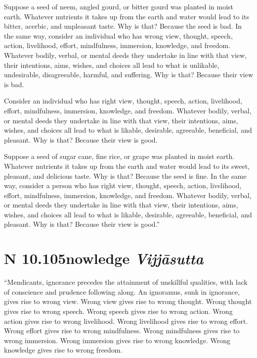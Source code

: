 \documentclass[12pt,openany]{book}%
\newcommand*{\suttatitleacronym}[1]{\smaller[2]{#1}\vspace*{.3em}}
\newcommand*{\suttatitletranslation}[1]{\linebreak{#1}}
\newcommand*{\suttatitleroot}[1]{\linebreak\smaller[2]\itshape{#1}}
\newcommand*{\tocacronym}[1]{\hspace*{-3.3em}{#1}\quad}
\newcommand*{\toctranslation}[1]{#1}
\newcommand*{\tocroot}[1]{(\textit{#1})}
\begin{document}
Suppose a seed of neem, angled gourd, or bitter gourd was planted in moist earth. Whatever nutrients it takes up from the earth and water would lead to its bitter, acerbic, and unpleasant taste. Why is that? Because the seed is bad. In the same way, consider an individual who has wrong view, thought, speech, action, livelihood, effort, mindfulness, immersion, knowledge, and freedom. Whatever bodily, verbal, or mental deeds they undertake in line with that view, their intentions, aims, wishes, and choices all lead to what is unlikable, undesirable, disagreeable, harmful, and suffering. Why is that? Because their view is bad. 

Consider an individual who has right view, thought, speech, action, livelihood, effort, mindfulness, immersion, knowledge, and freedom. Whatever bodily, verbal, or mental deeds they undertake in line with that view, their intentions, aims, wishes, and choices all lead to what is likable, desirable, agreeable, beneficial, and pleasant. Why is that? Because their view is good. 

Suppose a seed of sugar cane, fine rice, or grape was planted in moist earth. Whatever nutrients it takes up from the earth and water would lead to its sweet, pleasant, and delicious taste. Why is that? Because the seed is fine. In the same way, consider a person who has right view, thought, speech, action, livelihood, effort, mindfulness, immersion, knowledge, and freedom. Whatever bodily, verbal, or mental deeds they undertake in line with that view, their intentions, aims, wishes, and choices all lead to what is likable, desirable, agreeable, beneficial, and pleasant. Why is that? Because their view is good.” 

%
\section*{{\suttatitleacronym AN 10.105}{\suttatitletranslation Knowledge }{\suttatitleroot Vijjāsutta}}
\addcontentsline{toc}{section}{\tocacronym{AN 10.105} \toctranslation{Knowledge } \tocroot{Vijjāsutta}}

“Mendicants, ignorance precedes the attainment of unskillful qualities, with lack of conscience and prudence following along. An ignoramus, sunk in ignorance, gives rise to wrong view. Wrong view gives rise to wrong thought. Wrong thought gives rise to wrong speech. Wrong speech gives rise to wrong action. Wrong action gives rise to wrong livelihood. Wrong livelihood gives rise to wrong effort. Wrong effort gives rise to wrong mindfulness. Wrong mindfulness gives rise to wrong immersion. Wrong immersion gives rise to wrong knowledge. Wrong knowledge gives rise to wrong freedom. 
\end{document}
